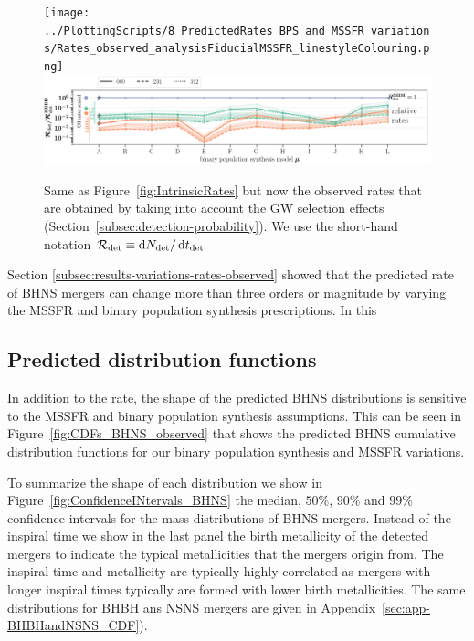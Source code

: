 \documentclass[twocolumn]{aastex63}
\newcommand\rate{\mathcal{R}}
\newcommand\bhnsSingle{BHNS\xspace}
\newcommand{\tdet}{\ensuremath{{t}_{\rm{det}}}\xspace}
\newcommand{\Ndet}{\ensuremath{{N}_{\rm{det}}}\xspace}
\newcommand*\diff{\mathop{}\!\mathrm{d}}
\begin{document}
%
\begin{figure}
    \centering
\texttt{[image: ../PlottingScripts/8\_PredictedRates\_BPS\_and\_MSSFR\_variations/Rates\_observed\_analysisFiducialMSSFR\_linestyleColouring.png]} %
\includegraphics[width=1.0\textwidth]{../PlottingScripts/8_PredictedRates_BPS_and_MSSFR_variations/RatesRatios_observed.png} 
    \caption{Same as Figure~\ref{fig:IntrinsicRates} but now the observed rates that are obtained by taking into account the \ac{GW} selection effects (Section~\ref{subsec:detection-probability}). We use the short-hand notation $\rate_{\rm{det}} \equiv \diff \Ndet / \diff \tdet$}%
    \label{fig:ObservedRates}
\end{figure}
%
Section \ref{subsec:results-variations-rates-observed} showed that the predicted rate of \bhnsSingle mergers can change more than three orders or magnitude by varying the \ac{MSSFR} and binary population synthesis prescriptions. In this  


\subsection{Predicted distribution functions}
%

In addition to the rate, the shape of the predicted \bhnsSingle distributions is sensitive to the \ac{MSSFR} and binary population synthesis assumptions. 
This can be seen in Figure~\ref{fig:CDFs_BHNS_observed} that shows the predicted \bhnsSingle  cumulative distribution functions for our binary population synthesis and \ac{MSSFR} variations. 

To summarize the shape of each distribution we show in Figure~\ref{fig:ConfidenceINtervals_BHNS}   the median, $50\%$, $90\%$ and $99\%$ confidence intervals for the mass distributions of \bhnsSingle mergers.  Instead of the inspiral time we show  in the last panel  the birth metallicity of the detected mergers to indicate the typical metallicities that the mergers origin from.  The inspiral time and metallicity are typically highly correlated as mergers with longer inspiral times typically are formed with lower birth  metallicities. The same distributions for  BHBH ans NSNS mergers are given in Appendix~\ref{sec:app-BHBHandNSNS_CDF}).
\end{document}

